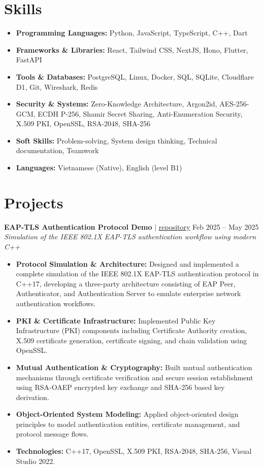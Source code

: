 \documentclass[10pt,a4paper]{article}
\begin{document}
\section*{Skills}
\begin{itemize}[leftmargin=0.15in, label={}, itemsep=0pt]
    \item \textbf{Programming Languages:} Python, JavaScript, TypeScript, C++, Dart
    \item \textbf{Frameworks \& Libraries:} React, Tailwind CSS, NextJS, Hono, Flutter, FastAPI
    \item \textbf{Tools \& Databases:} PostgreSQL, Linux, Docker, SQL, SQLite, Cloudflare D1, Git, Wireshark, Redis
    \item \textbf{Security \& Systems:} Zero-Knowledge Architecture, Argon2id, AES-256-GCM, ECDH P-256, Shamir Secret Sharing, Anti-Enumeration Security, X.509 PKI, OpenSSL, RSA-2048, SHA-256
    \item \textbf{Soft Skills:} Problem-solving, System design thinking, Technical documentation, Teamwork
    \item \textbf{Languages:} Vietnamese (Native), English (level B1)
\end{itemize}

\section*{Projects}

\noindent \textbf{EAP-TLS Authentication Protocol Demo} $|$ \href{https://github.com/vyquochuy/EAP-TLS-DEMO}{repository} \hfill Feb 2025 -- May 2025\\
\textit{Simulation of the IEEE 802.1X EAP-TLS authentication workflow using modern C++}
\begin{itemize}[leftmargin=0.25in, nosep]
    \item \textbf{Protocol Simulation \& Architecture:} Designed and implemented a complete simulation of the IEEE 802.1X EAP-TLS authentication protocol in C++17, developing a three-party architecture consisting of EAP Peer, Authenticator, and Authentication Server to emulate enterprise network authentication workflows.
    \item \textbf{PKI \& Certificate Infrastructure:} Implemented Public Key Infrastructure (PKI) components including Certificate Authority creation, X.509 certificate generation, certificate signing, and chain validation using OpenSSL.
    \item \textbf{Mutual Authentication \& Cryptography:} Built mutual authentication mechanisms through certificate verification and secure session establishment using RSA-OAEP encrypted key exchange and SHA-256 based key derivation.
    \item \textbf{Object-Oriented System Modeling:} Applied object-oriented design principles to model authentication entities, certificate management, and protocol message flows.
    \item \textbf{Technologies:} C++17, OpenSSL, X.509 PKI, RSA-2048, SHA-256, Visual Studio 2022.
\end{itemize}
\vspace{10pt}
\end{document}
